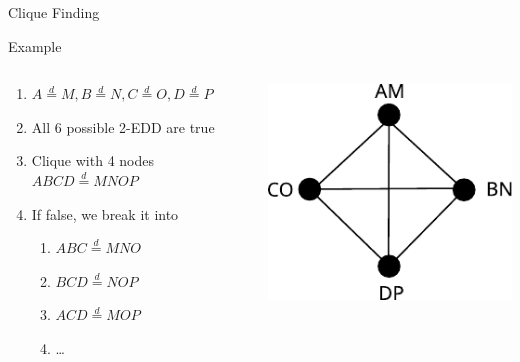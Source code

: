 \documentclass[10pt,notes]{beamer}
\newcommand{\eqdist}{\stackrel{d}{=}}
\begin{document}
\begin{frame}{Clique Finding}
    \begin{exampleblock}{Example}
        \begin{columns}
        \begin{column}{.7\textwidth}
        \begin{enumerate}
            \item $A \eqdist M, B \eqdist N, C \eqdist O, D \eqdist P$
            \item All 6 possible 2-EDD are true
            \item Clique with 4 nodes $ABCD \eqdist MNOP$
            \item If false, we break it into
                \begin{enumerate}
                    \item $ABC \eqdist MNO$
                    \item $BCD \eqdist NOP$
                    \item $ACD \eqdist MOP$
                    \item \ldots
                \end{enumerate}
        \end{enumerate}
        \end{column}
        \begin{column}{.3\textwidth}
            \includegraphics[width=\linewidth]{4clique}
        \end{column}
        \end{columns}
    \end{exampleblock}
    

\end{frame}
\end{document}
